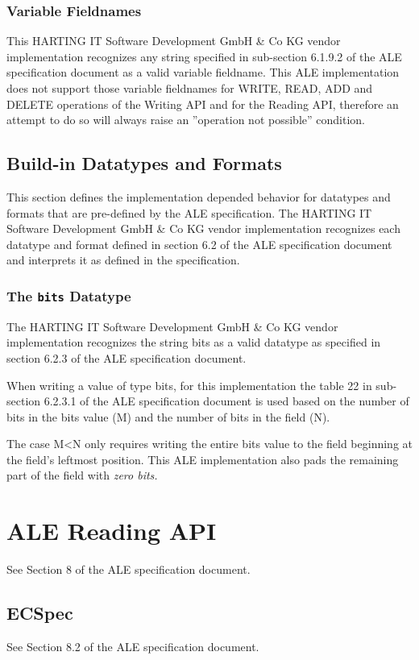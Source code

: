 \documentclass[11pt,a4paper,oneside]{article}
\begin{document}
\subsubsection{Variable Fieldnames}
This HARTING IT Software Development GmbH \& Co KG  vendor implementation recognizes any string specified in sub-section 6.1.9.2 of the ALE specification document as a valid variable fieldname. This ALE implementation does not support those variable fieldnames for WRITE, READ, ADD and DELETE operations of the Writing API and for the Reading API, therefore an attempt to do so will always raise an ''operation not possible'' condition.

\subsection{Build-in Datatypes and Formats}
This section defines the implementation depended behavior for datatypes and formats that are pre-defined by the ALE specification. The HARTING IT Software Development GmbH \& Co KG vendor implementation recognizes each datatype and format defined in section 6.2 of the ALE specification document and interprets it as defined in the specification. 

\subsubsection{The \texttt{bits} Datatype}
The HARTING IT Software Development GmbH \& Co KG  vendor implementation recognizes the string bits as a valid datatype as specified in section 6.2.3 of the ALE specification document.

When writing a value of type bits, for this implementation the table 22 in sub-section 6.2.3.1 of the ALE specification document is used based on the number of bits in the bits value (M) and the number of bits in the field (N).

The case M\textless N only requires writing the entire bits value to the field beginning at the field's leftmost position. This ALE implementation also pads the remaining part of the field with \emph{zero bits.}

\section{ALE Reading API}
See Section 8 of the ALE specification document.

\subsection{ECSpec}
See Section 8.2 of the ALE specification document.
\end{document}
